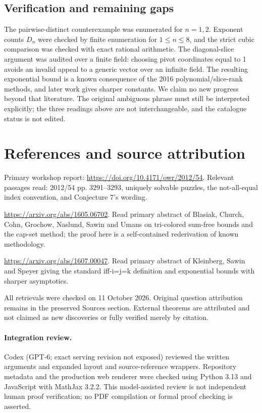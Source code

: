 \documentclass[11pt]{article}
\begin{document}
\subsection{Verification and remaining gaps}
The pairwise-distinct counterexample was enumerated for $n=1,2$. Exponent counts $D_n$ were checked by finite enumeration for $1\le n\le8$, and the strict cubic comparison was checked with exact rational arithmetic. The diagonal-slice argument was audited over a finite field: choosing pivot coordinates equal to 1 avoids an invalid appeal to a generic vector over an infinite field. The resulting exponential bound is a known consequence of the 2016 polynomial/slice-rank methods, and later work gives sharper constants. We claim no new progress beyond that literature. The original ambiguous phrase must still be interpreted explicitly; the three readings above are not interchangeable, and the catalogue status is not edited.

\section{References and source attribution}
Primary workshop report: \url{https://doi.org/10.4171/owr/2012/54}. Relevant passages read: 2012/54 pp. 3291--3293, uniquely solvable puzzles, the not-all-equal index convention, and Conjecture 7’s wording.

\url{https://arxiv.org/abs/1605.06702}. Read primary abstract of Blasiak, Church, Cohn, Grochow, Naslund, Sawin and Umans on tri-colored sum-free bounds and the cap-set method; the proof here is a self-contained rederivation of known methodology.

\url{https://arxiv.org/abs/1607.00047}. Read primary abstract of Kleinberg, Sawin and Speyer giving the standard iff-i=j=k definition and exponential bounds with sharper asymptotics.

All retrievals were checked on 11 October 2026. Original question attribution remains in the preserved Sources section. External theorems are attributed and not claimed as new discoveries or fully verified merely by citation.


\paragraph{Integration review.} Codex (GPT-6; exact serving revision not exposed) reviewed the written arguments and expanded layout and source-reference wrappers. Repository metadata and the production web renderer were checked using Python 3.13 and JavaScript with MathJax 3.2.2. This model-assisted review is not independent human proof verification; no PDF compilation or formal proof checking is asserted.
\end{document}
